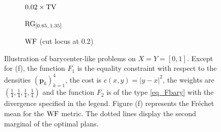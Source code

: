 \begin{figure}
\begin{subfigure}{0.5\linewidth}
{}
\caption{$0.02\times \operatorname{TV}$}
\end{subfigure}
\begin{subfigure}{0.5\linewidth} 
\centering
\caption{$\operatorname{RG}_{[0.65,\,1.35]}$}
\end{subfigure}%
\begin{subfigure}{0.5\linewidth} 
\centering
\caption{$\operatorname{WF}$ (cut locus at $0.2$)}\label{fig_bary1d_WF}
\end{subfigure}%
\caption{Illustration of barycenter-like problems on $X=Y=[0,1]$. Except for (f), the function $F_1$ is the equality constraint with respect to the densities $(\mathbf{p}_k)_{k=1}^4$, the cost is $c(x,y)=|y-x|^2$, the weights are $(\tfrac14,\tfrac14,\tfrac14,\tfrac14)$ and the function $F_2$ is of the type \eqref{eq_Fbary} with the divergence specified in the legend. Figure (f) represents the Fr\'echet mean for the $\operatorname{WF}$ metric. The dotted lines display the second marginal of the optimal plans.}
\label{fig_1Dbarycenter}
\end{figure}

